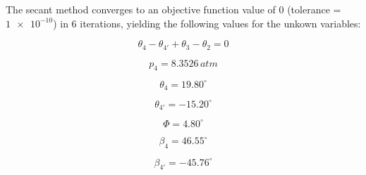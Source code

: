 \documentclass[../main.tex]{subfiles}
\begin{document}
The secant method converges to an objective function value of 0 (tolerance = \(\num{1e-10}\)) in 6 iterations, yielding the following values for the unkown variables:

\[
    \boxed{
        \theta_4  - \theta_{4'} + \theta_3 - \theta_2 = 0
    }
\]

\[
    \boxed{
        p_4 = 8.3526\,\unit{atm}
    }
\]

\[
    \boxed{
        \theta_4 = 19.80^\circ
    }
\]

\[
    \boxed{
        \theta_{4'} = -15.20^\circ
    }
\]

\[
    \boxed{
        \Phi = 4.80^\circ
    }
\]

\[
    \boxed{
        \beta_4 = 46.55^\circ
    }
\]

\[
    \boxed{
        \beta_{4'} = -45.76^\circ
    }
\]
\end{document}
